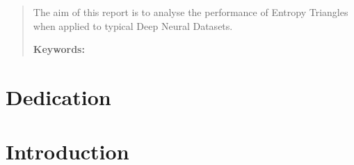 \documentclass[12pt]{report}
\begin{document}
\newpage %
\thispagestyle{empty}
\mbox{}

\renewcommand\abstractname{\large\uppercase{Summary}}
\begin{abstract}
\thispagestyle{plain}
\setcounter{page}{3}
	
The aim of this report is to analyse the performance of Entropy Triangles when applied to typical Deep Neural Datasets.
	
	\textbf{Keywords:}
	
	\vfill
\end{abstract}
	\newpage %
	\thispagestyle{empty}
	\mbox{}


\chapter*{Dedication}

\setcounter{page}{5}
	
		
	\vfill
	
	\newpage %
	\thispagestyle{empty}
	\mbox{}
	


\tableofcontents
\thispagestyle{fancy}

\newpage %
\thispagestyle{empty}
\mbox{}

\listoffigures
\thispagestyle{fancy}

\newpage %
\thispagestyle{empty}
\mbox{}

\listoftables
\thispagestyle{fancy}

\newpage %
\thispagestyle{empty}
\mbox{}


\clearpage
{} %


\chapter{Introduction}
\end{document}
